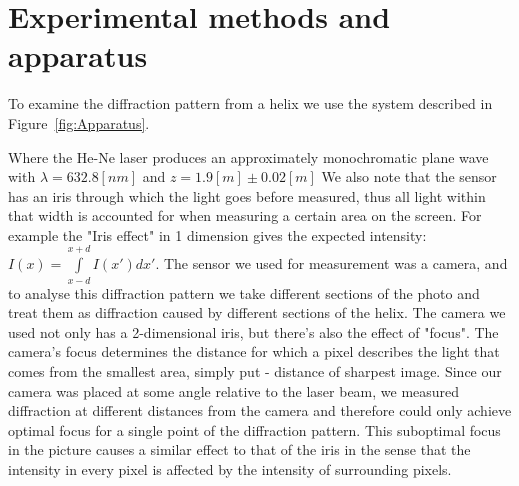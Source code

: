 \section{Experimental methods and apparatus}\label{sec:experimental-technique-and-apparatus}
To examine the diffraction pattern from a helix we use the system described in Figure~\ref{fig:Apparatus}.

Where the He-Ne laser produces an approximately monochromatic plane wave with $\lambda=632.8 [nm]$ and $z=1.9[m]\pm0.02[m]$
We also note that the sensor has an iris through which the light goes before measured, thus all light within that width is accounted for when measuring a
certain area on the screen.
For example the "Iris effect" in 1 dimension gives the expected intensity: $I(x)=\int\limits_{x-d}^{x+d}I(x')dx'$.
The sensor we used for measurement was a camera, and to analyse this diffraction pattern we take different sections of the photo and treat them as diffraction caused by different sections of the helix.
The camera we used not only has a 2-dimensional iris, but there's also the effect of "focus".
The camera's focus determines the distance for which a pixel describes the light that comes from the smallest area, simply put - distance of sharpest image.
Since our camera was placed at some angle relative to the laser beam, we measured diffraction at different distances from the camera and therefore could only achieve optimal focus for a single point of the diffraction pattern.
This suboptimal focus in the picture causes a similar effect to that of the iris in the sense that the intensity in every pixel is affected by the intensity of surrounding pixels.
